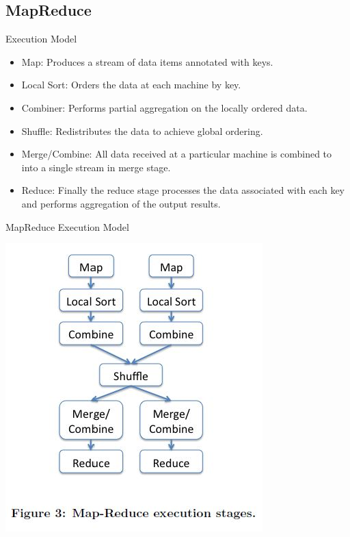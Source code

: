 \subsection{MapReduce}
\begin{frame}{Execution Model}
\begin{itemize}
	\item Map: Produces a stream of data items annotated with keys.
	\item Local Sort: Orders the data at each machine by key.
	\item Combiner: Performs partial aggregation on the locally ordered data.
	\item Shuffle: Redistributes the data to achieve global ordering.
	\item Merge/Combine: All data received at a particular machine is combined to into a single stream in merge stage.
	\item Reduce: Finally the reduce stage processes the data associated with each key and performs aggregation of the output results.
\end{itemize}
\end{frame}

\begin{frame}{MapReduce Execution Model}
\centerline{\includegraphics[scale=0.5]{Images/MapReduce_Execution.JPG}}
\let\thefootnote\relax{} 
\end{frame}

